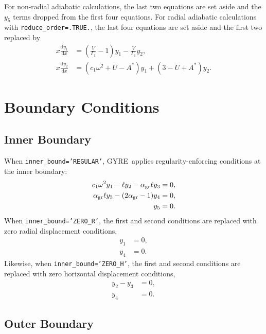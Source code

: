 \documentclass[fleqn]{article}
\newcommand{\gyre}{GYRE}
\newcommand{\diff}{\mathrm{d}}
\newcommand{\Vg}{\frac{V}{\Gamma_{1}}}
\newcommand{\As}{A^{\ast}}
\newcommand{\agr}{\alpha_{\rm gr}}
\begin{document}
For non-radial adiabatic calculations, the last two equations are set
aside and the $y_{5}$ terms dropped from the first four equations. For
radial adiabatic calculations with \texttt{reduce\_order=.TRUE.}, the
last four equations are set aside and the first two replaced by
\begin{align*}
x \frac{\diff y_{1}}{\diff x} &=
\left(\Vg - 1 \right) y_{1} 
- \Vg y_{2}, \\
x \frac{\diff y_{2}}{\diff x} &=
(c_{1} \omega^{2} + U - \As ) y_{1} +
(3 - U + \As) y_{2}.
\end{align*}

\section*{Boundary Conditions}

\subsection*{Inner Boundary}

When \texttt{inner\_bound='REGULAR'}, \gyre\ applies
regularity-enforcing conditions at the inner boundary:
\begin{align*}
c_{1} \omega^{2} y_{1} - \ell y_{2} - \agr \ell y_{3} &= 0, \\
\agr \ell y_{3} - (2\agr - 1) y_{4} &= 0, \\
y_{5} &= 0.
\end{align*}
When \texttt{inner\_bound='ZERO\_R'}, the first and second conditions are replaced with zero radial displacement conditions,
\begin{align*}
y_{1} &= 0, \\
y_{4} &= 0.
\end{align*}
Likewise, when \texttt{inner\_bound='ZERO\_H'}, the first and second conditions are replaced with zero horizontal displacement conditions,
\begin{align*}
y_{2} - y_{3} &= 0, \\
y_{4} &= 0.
\end{align*}


\subsection*{Outer Boundary}
 
\end{document}
